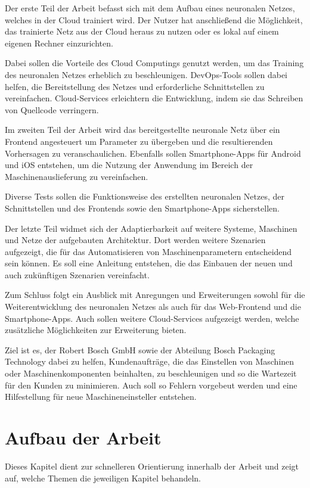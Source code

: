 Der erste Teil der Arbeit befasst sich mit dem Aufbau eines neuronalen Netzes, welches in der Cloud trainiert wird. Der
Nutzer hat anschließend die Möglichkeit, das trainierte Netz aus der Cloud heraus zu nutzen oder es lokal auf einem
eigenen Rechner einzurichten.

Dabei sollen die Vorteile des Cloud Computings genutzt werden, um das Training des neuronalen Netzes erheblich zu
beschleunigen. DevOps-Tools sollen dabei helfen, die Bereitstellung des Netzes und erforderliche Schnittstellen zu
vereinfachen. Cloud-Services erleichtern die Entwicklung, indem sie das Schreiben von Quellcode verringern.

Im zweiten Teil der Arbeit wird das bereitgestellte neuronale Netz über ein Frontend angesteuert um Parameter zu
übergeben und die resultierenden Vorhersagen zu veranschaulichen. Ebenfalls sollen Smartphone-Apps für Android und iOS
entstehen, um die Nutzung der Anwendung im Bereich der Maschinenauslieferung zu vereinfachen.

Diverse Tests sollen die Funktionsweise des erstellten neuronalen Netzes, der Schnittstellen und des Frontends
sowie den Smartphone-Apps sicherstellen.

Der letzte Teil widmet sich der Adaptierbarkeit auf weitere Systeme, Maschinen und Netze der aufgebauten Architektur.
Dort werden weitere Szenarien aufgezeigt, die für das Automatisieren von Maschinenparametern entscheidend sein können.
Es soll eine Anleitung entstehen, die das Einbauen der neuen und auch zukünftigen Szenarien vereinfacht.

Zum Schluss folgt ein Ausblick mit Anregungen und Erweiterungen sowohl für die Weiterentwicklung des neuronalen Netzes
als auch für das Web-Frontend und die Smartphone-Apps. Auch sollen weitere Cloud-Services aufgezeigt werden, welche
zusätzliche Möglichkeiten zur Erweiterung bieten.

Ziel ist es, der Robert Bosch GmbH sowie der Abteilung Bosch Packaging Technology dabei zu helfen, Kundenaufträge, die
das Einstellen von Maschinen oder Maschinenkomponenten beinhalten, zu beschleunigen und so die Wartezeit für den Kunden
zu minimieren. Auch soll so Fehlern vorgebeut werden und eine Hilfestellung für neue Maschineneinsteller entstehen.

\newpage

\section{Aufbau der Arbeit}
\label{sec:aufbauDerArbeit}
Dieses Kapitel dient zur schnelleren Orientierung innerhalb der Arbeit und zeigt auf, welche Themen die jeweiligen
Kapitel behandeln.

